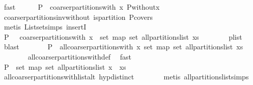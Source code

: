 \begin{isabellebody}
\ fast\isanewline
\ \ \ \ \isamarkupfalse%
\ {\isachardoublequoteopen}P\ {\isasymin}\ coarser{\isacharunderscore}partitions{\isacharunderscore}with\ x\ {\isacharquery}P{\isacharunderscore}without{\isacharunderscore}x{\isachardoublequoteclose}\isanewline
\ \ \ \ \ \ \isamarkupfalse%
\ coarser{\isacharunderscore}partitions{\isacharunderscore}inv{\isacharunderscore}without\ is{\isacharunderscore}partition\ P{\isacharunderscore}covers\isanewline
\ \ \ \ \ \ \isamarkupfalse%
\ {\isacharparenleft}metis\ List{\isachardot}set{\isacharunderscore}simps{\isacharparenleft}{}{\isacharparenright}\ insertI{}{\isacharparenright}\isanewline
\ \ \ \ \isamarkupfalse%
\ \isamarkupfalse%
\ {\isachardoublequoteopen}P\ {\isasymin}\ {\isasymUnion}\ {\isacharparenleft}coarser{\isacharunderscore}partitions{\isacharunderscore}with\ x\ {\isacharbackquote}\ set\ {\isacharparenleft}map\ set\ {\isacharparenleft}all{\isacharunderscore}partitions{\isacharunderscore}list\ xs{\isacharparenright}{\isacharparenright}{\isacharparenright}{\isachardoublequoteclose}\isanewline
\ \ \ \ \ \ \isamarkupfalse%
\ p{\isacharunderscore}list\ \isamarkupfalse%
\ blast\isanewline
\ \ \ \ \isamarkupfalse%
\ \isamarkupfalse%
\ {\isachardoublequoteopen}P\ {\isasymin}\ all{\isacharunderscore}coarser{\isacharunderscore}partitions{\isacharunderscore}with\ x\ {\isacharparenleft}set\ {\isacharparenleft}map\ set\ {\isacharparenleft}all{\isacharunderscore}partitions{\isacharunderscore}list\ xs{\isacharparenright}{\isacharparenright}{\isacharparenright}{\isachardoublequoteclose}\isanewline
\ \ \ \ \ \ \isamarkupfalse%
\ all{\isacharunderscore}coarser{\isacharunderscore}partitions{\isacharunderscore}with{\isacharunderscore}def\ \isamarkupfalse%
\ fast\isanewline
\ \ \ \ \isamarkupfalse%
\ \isamarkupfalse%
\ {\isachardoublequoteopen}P\ {\isasymin}\ set\ {\isacharparenleft}map\ set\ {\isacharparenleft}all{\isacharunderscore}partitions{\isacharunderscore}list\ {\isacharparenleft}x\ {\isacharhash}\ xs{\isacharparenright}{\isacharparenright}{\isacharparenright}{\isachardoublequoteclose}\isanewline
\ \ \ \ \ \ \isamarkupfalse%
\ all{\isacharunderscore}coarser{\isacharunderscore}partitions{\isacharunderscore}with{\isacharunderscore}list{\isacharunderscore}alt\ hyp{\isacharunderscore}distinct\isanewline
\ \ \ \ \ \ \isamarkupfalse%
\ {\isacharparenleft}metis\ all{\isacharunderscore}partitions{\isacharunderscore}list{\isachardot}simps{\isacharparenleft}{}{\isacharparenright}{\isacharparenright}\isanewline

\end{isabellebody}
